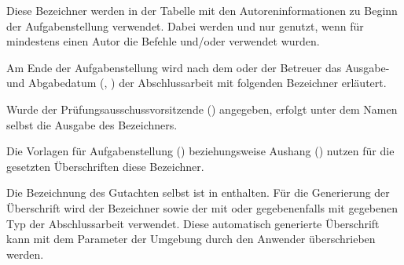 \begin{Declaration}{}
\begin{Declaration}{}
\begin{Declaration}{}
\begin{Declaration}{}
\printdeclarationlist%
%
Diese Bezeichner werden in der Tabelle mit den Autoreninformationen zu Beginn 
der Aufgabenstellung verwendet. Dabei werden  und 
 nur genutzt, wenn für mindestens einen Autor die Befehle 
 und/oder  verwendet wurden.
\end{Declaration}
\end{Declaration}
\end{Declaration}
\end{Declaration}

\begin{Declaration}{}
\begin{Declaration}{}
\printdeclarationlist%
%
Am Ende der Aufgabenstellung wird nach dem oder der Betreuer das Ausgabe- und 
Abgabedatum (, ) der Abschlussarbeit mit 
folgenden Bezeichner erläutert.
\end{Declaration}
\end{Declaration}

\begin{Declaration}{}
\printdeclarationlist%
%
Wurde der Prüfungsausschussvorsitzende () angegeben, erfolgt 
unter dem Namen selbst die Ausgabe des Bezeichners.
\end{Declaration}

\begin{Declaration}{}
\begin{Declaration}{}
\printdeclarationlist%
%
Die Vorlagen für Aufgabenstellung () beziehungsweise Aushang 
() nutzen für die gesetzten Überschriften diese Bezeichner.
\end{Declaration}
\end{Declaration}

\begin{Declaration}{}
\begin{Declaration}{}
\printdeclarationlist%
%
Die Bezeichnung des Gutachten selbst ist in  enthalten. 
Für die Generierung der Überschrift wird der Bezeichner  
sowie der mit  oder gegebenenfalls mit  gegebenen 
Typ der Abschlussarbeit verwendet. Diese automatisch generierte Überschrift 
kann mit dem Parameter  der 
Umgebung  durch den Anwender überschrieben werden.
\end{Declaration}
\end{Declaration}

